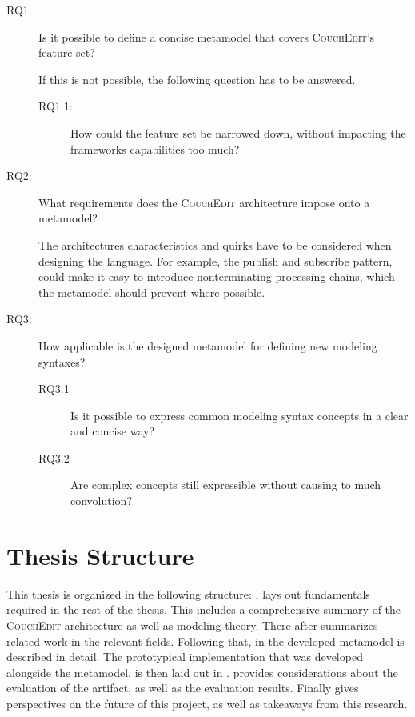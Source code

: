 \begin{description} 
  \item[RQ1:] Is it possible to define a concise metamodel that covers \textsc{CouchEdit}'s feature set?

        If this is not possible, the following question has to be answered.
        \begin{description}
          \item[RQ1.1:] How could the feature set be narrowed down, without impacting the frameworks capabilities too much?
        \end{description}

  \item[RQ2:] What requirements does the \textsc{CouchEdit} architecture impose onto a metamodel?

        The architectures characteristics and quirks have to be considered when designing the language. For example, the publish and subscribe pattern, could make it easy to introduce nonterminating processing chains, which the metamodel should prevent where possible.

  \item[RQ3:] How applicable is the designed metamodel for defining new modeling syntaxes?

        \begin{description}
          \item[RQ3.1] Is it possible to express common modeling syntax concepts in a clear and concise way?
          \item[RQ3.2] Are complex concepts still expressible without causing to much convolution?
        \end{description}
\end{description}



\section{Thesis Structure}
This thesis is organized in the following structure: , lays out fundamentals required in the rest of the thesis. This includes a comprehensive summary of the \textsc{CouchEdit} architecture as well as modeling theory. There after  summarizes related work in the relevant fields. Following that, in  the developed metamodel is described in detail. The prototypical implementation that was developed alongside the metamodel, is then laid out in .  provides considerations about the evaluation of the artifact, as well as the evaluation results. Finally  gives perspectives on the future of this project, as well as takeaways from this research.